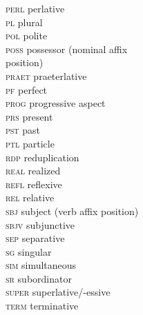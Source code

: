\begin{refsection}
\begin{multicols}{2}
\begin{tabbing}
	\textsc{perl} \>  perlative\\
	
	\textsc{pl} \>  plural\\
	
	\textsc{pol} \>  polite\\
	
	\textsc{poss} \>  possessor (nominal affix \\
	
	\> position)\\
	
	\textsc{praet} \>  praeterlative\\
	
	\textsc{pf} \>  perfect\\
	
	\textsc{prog} \>  progressive aspect\\
	
	\textsc{prs} \>  present\\
	
	\textsc{pst} \>  past\\
	
	\textsc{ptl} \>  particle\\
	
	\textsc{rdp} \>  reduplication\\
	
	\textsc{real} \>  realized\\
	
	\textsc{refl} \>  reflexive\\
	
	\textsc{rel} \>  relative\\
	
	\textsc{sbj} \>  subject (verb affix position)\\
	
	\textsc{sbjv} \>  subjunctive\\
	
	\textsc{sep} \>  separative\\
	
	\textsc{sg} \>  singular\\
	
	\textsc{sim} \>  simultaneous\\
	
	\textsc{sr} \>  subordinator\\
	
	\textsc{super} \>  superlative/-essive\\
	
	\textsc{term} \>  terminative\\
	

\end{tabbing}
\end{multicols}
\end{refsection}
